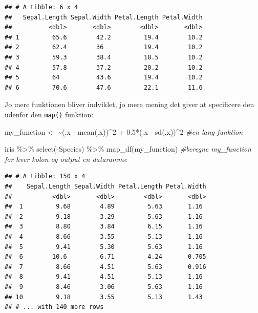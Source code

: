 \documentclass[
]{book}
\newenvironment{Shaded}{\begin{snugshade}}{\end{snugshade}}
\newcommand{\CommentTok}[1]{\textcolor[rgb]{0.56,0.35,0.01}{\textit{#1}}}
\newcommand{\DecValTok}[1]{\textcolor[rgb]{0.00,0.00,0.81}{#1}}
\newcommand{\ErrorTok}[1]{\textcolor[rgb]{0.64,0.00,0.00}{\textbf{#1}}}
\newcommand{\FloatTok}[1]{\textcolor[rgb]{0.00,0.00,0.81}{#1}}
\newcommand{\FunctionTok}[1]{\textcolor[rgb]{0.00,0.00,0.00}{#1}}
\newcommand{\NormalTok}[1]{#1}
\newcommand{\OtherTok}[1]{\textcolor[rgb]{0.56,0.35,0.01}{#1}}
\newcommand{\SpecialCharTok}[1]{\textcolor[rgb]{0.00,0.00,0.00}{#1}}
\begin{document}
\begin{verbatim}
## # A tibble: 6 x 4
##   Sepal.Length Sepal.Width Petal.Length Petal.Width
##          <dbl>       <dbl>        <dbl>       <dbl>
## 1         65.6        42.2         19.4        10.2
## 2         62.4        36           19.4        10.2
## 3         59.3        38.4         18.5        10.2
## 4         57.8        37.2         20.2        10.2
## 5         64          43.6         19.4        10.2
## 6         70.6        47.6         22.1        11.6
\end{verbatim}

Jo mere funktionen bliver indviklet, jo mere mening det giver at specificere den udenfor den \texttt{map()} funktion:

\begin{Shaded}
\begin{Highlighting}[]
\NormalTok{my\_function }\OtherTok{\textless{}{-}} \ErrorTok{\textasciitilde{}}\NormalTok{(.x }\SpecialCharTok{{-}} \FunctionTok{mean}\NormalTok{(.x))}\SpecialCharTok{\^{}}\DecValTok{2} \SpecialCharTok{+} \FloatTok{0.5}\SpecialCharTok{*}\NormalTok{(.x }\SpecialCharTok{{-}} \FunctionTok{sd}\NormalTok{(.x))}\SpecialCharTok{\^{}}\DecValTok{2} \CommentTok{\#en lang funktion}

\NormalTok{iris }\SpecialCharTok{\%\textgreater{}\%}
  \FunctionTok{select}\NormalTok{(}\SpecialCharTok{{-}}\NormalTok{Species) }\SpecialCharTok{\%\textgreater{}\%}
  \FunctionTok{map\_df}\NormalTok{(my\_function) }\CommentTok{\#beregne my\_function for hver kolon og output en dataramme }
\end{Highlighting}
\end{Shaded}

\begin{verbatim}
## # A tibble: 150 x 4
##    Sepal.Length Sepal.Width Petal.Length Petal.Width
##           <dbl>       <dbl>        <dbl>       <dbl>
##  1         9.68        4.89         5.63       1.16 
##  2         9.18        3.29         5.63       1.16 
##  3         8.80        3.84         6.15       1.16 
##  4         8.66        3.55         5.13       1.16 
##  5         9.41        5.30         5.63       1.16 
##  6        10.6         6.71         4.24       0.705
##  7         8.66        4.51         5.63       0.916
##  8         9.41        4.51         5.13       1.16 
##  9         8.46        3.06         5.63       1.16 
## 10         9.18        3.55         5.13       1.43 
## # ... with 140 more rows
\end{verbatim}
\end{document}
